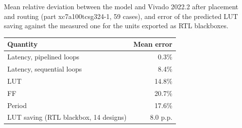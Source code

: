 \documentclass[11pt,a4paper]{article}
\begin{document}
Mean relative deviation between the model and Vivado 2022.2 after placement and routing (part xc7a100tcsg324-1, 59
cases), and error of the predicted LUT saving against the measured one for the units exported as RTL blackboxes.

\begin{center}
\begin{tabular}{|l|r|}
\hline
\rowcolor{tabAzul}\color{white} Quantity & \color{white} Mean error \\
\hline
Latency, pipelined loops & 0.3\% \\
Latency, sequential loops & 8.4\% \\
LUT & 14.8\% \\
FF & 20.7\% \\
Period & 17.6\% \\
LUT saving (RTL blackbox, 14 designs) & 8.0 p.p. \\
\hline
\end{tabular}
\end{center}
\end{document}
